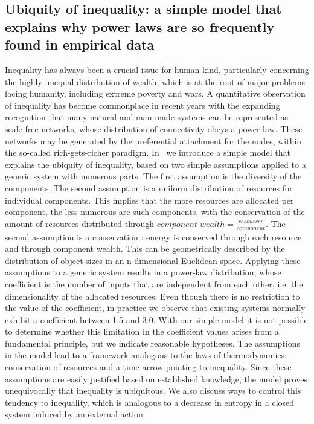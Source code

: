 \begin{apendicesenv}
\section{Ubiquity of inequality: a simple model that explains why power laws are so frequently found in empirical data}
	Inequality has always been a crucial issue for human kind, particularly concerning the highly unequal distribution of wealth, which is at the root of major problems facing humanity, including extreme poverty and wars.
	A quantitative observation of inequality has become commonplace in recent years
	with the expanding recognition that many natural and man-made systems can be represented as scale-free networks,
	whose distribution of connectivity obeys a power law.
	These networks may be generated by the preferential attachment for the nodes, within the so-called rich-gets-richer paradigm.
	In~\cite{ubiIne} we introduce a simple model that explains the ubiquity of inequality, based on two simple assumptions applied to a generic system with numerous parts.
	The first assumption is the diversity of the components.
	The second assumption is a uniform distribution of resources for individual components.
	This implies that the more resources are allocated per component, the less numerous are such components,
	with the conservation of the amount of resources distributed through $component\; wealth = \frac{resources}{component}$.
	The second assumption is a conservation : energy is conserved through each resource and through component wealth.
	This can be geometrically described by the distribution of object sizes in an n-dimensional Euclidean space.
	Applying these assumptions to a generic system results in a power-law distribution, whose coefficient is the number of inputs that are independent from each other,
	i.e. the dimensionality of the allocated resources.
	Even though there is no restriction to the value of the coefficient,
	in practice we observe that existing systems normally exhibit a coefficient between 1.5 and 3.0.
	With our simple model it is not possible to determine whether this limitation in the coefficient values arises from a fundamental principle, but we indicate reasonable hypotheses.
	The assumptions in the model lead to a framework analogous to the laws of thermodynamics:
	conservation of resources and a time arrow pointing to inequality.
	Since these assumptions are easily justified based on established knowledge,
	the model proves unequivocally that inequality is ubiquitous.
	We also discuss ways to control this tendency to inequality,
	which is analogous to a decrease in entropy in a closed system induced by an external action.


\end{apendicesenv}
